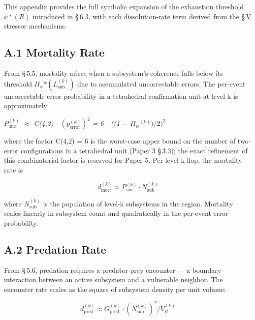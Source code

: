 \documentclass[11pt,oneside]{report}
\theoremstyle{definition}
\theoremstyle{remark}
\begin{document}
This appendix provides the full symbolic expansion of the exhaustion
threshold \ensuremath{\nu *(R)} introduced in \S\,6.3, with each dissolution-rate term
derived from the \S\,V stressor mechanisms.

\subsection*{A.1 Mortality Rate}

From \S\,5.5, mortality arises when a subsystem's coherence falls below its
threshold \textbar \ensuremath{\Pi_{\psi}}\textbar\ensuremath{*(L_{\mathrm{sub}}^{(k)})} due to accumulated
uncorrectable errors. The per-event uncorrectable error probability in a
tetrahedral confirmation unit at level k is approximately

\emph{\ensuremath{P_{\mathrm{unc}}^{(k)}} \ensuremath{\approx} C(4,2) \ensuremath{\cdot} \ensuremath{(p_{\mathrm{error}}^{(k)})^{2}} = 6 \ensuremath{\cdot} ((1 \ensuremath{-}
\textbar \ensuremath{\Pi_{\psi}}\textbar\ensuremath{^{(k)})/2)^{2}}}

where the factor C(4,2) = 6 is the worst-case upper bound on the number
of two-error configurations in a tetrahedral unit (Paper 3 \S\,3.3); the
exact refinement of this combinatorial factor is reserved for Paper 5.
Per level-k flop, the mortality rate is

\begin{equation*}
d_{\mathrm{mort}}^{(k)} \approx P_{\mathrm{unc}}^{(k)} \cdot N_{\mathrm{sub}}^{(k)}
\end{equation*}

where \ensuremath{N_{\mathrm{sub}}^{(k)}} is the population of level-k subsystems in the
region. Mortality scales linearly in subsystem count and quadratically
in the per-event error probability.

\subsection*{A.2 Predation Rate}

From \S\,5.6, predation requires a predator-prey encounter --- a boundary
interaction between an active subsystem and a vulnerable neighbor. The
encounter rate scales as the square of subsystem density per unit
volume:

\begin{equation*}
d_{\mathrm{pred}}^{(k)} \approx G_{\mathrm{pred}}^{(k)} \cdot (N_{\mathrm{sub}}^{(k)})^{2} / V_{R}^{(k)}
\end{equation*}
\end{document}

